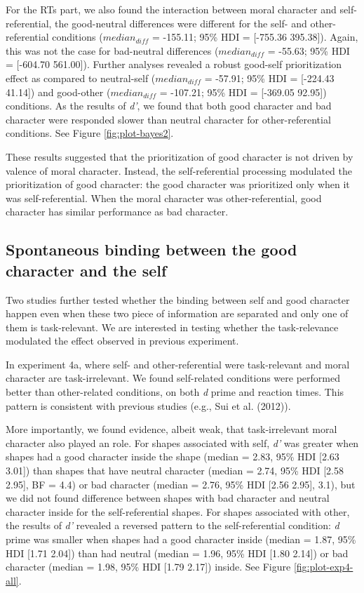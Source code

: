 \documentclass[
  man]{apa6}
\begin{document}
For the RTs part, we also found the interaction between moral character and self-referential, the good-neutral differences were different for the self- and other-referential conditions (\(median_{diff}\) = -155.11; 95\% HDI = {[}-755.36 395.38{]}). Again, this was not the case for bad-neutral differences (\(median_{diff}\) = -55.63; 95\% HDI = {[}-604.70 561.00{]}). Further analyses revealed a robust good-self prioritization effect as compared to neutral-self (\(median_{diff}\) = -57.91; 95\% HDI = {[}-224.43 41.14{]}) and good-other (\(median_{diff}\) = -107.21; 95\% HDI = {[}-369.05 92.95{]}) conditions. As the results of \emph{d'}, we found that both good character and bad character were responded slower than neutral character for other-referential conditions. See Figure \ref{fig:plot-bayes2}.

These results suggested that the prioritization of good character is not driven by valence of moral character. Instead, the self-referential processing modulated the prioritization of good character: the good character was prioritized only when it was self-referential. When the moral character was other-referential, good character has similar performance as bad character.

\hypertarget{spontaneous-binding-between-the-good-character-and-the-self}{%
\subsection{Spontaneous binding between the good character and the self}\label{spontaneous-binding-between-the-good-character-and-the-self}}

Two studies further tested whether the binding between self and good character happen even when these two piece of information are separated and only one of them is task-relevant. We are interested in testing whether the task-relevance modulated the effect observed in previous experiment.

In experiment 4a, where self- and other-referential were task-relevant and moral character are task-irrelevant. We found self-related conditions were performed better than other-related conditions, on both \emph{d} prime and reaction times. This pattern is consistent with previous studies (e.g., Sui et al. (2012)).

More importantly, we found evidence, albeit weak, that task-irrelevant moral character also played an role. For shapes associated with self, \emph{d'} was greater when shapes had a good character inside the shape (median = 2.83, 95\% HDI {[}2.63 3.01{]}) than shapes that have neutral character (median = 2.74, 95\% HDI {[}2.58 2.95{]}, BF = 4.4) or bad character (median = 2.76, 95\% HDI {[}2.56 2.95{]}, 3.1), but we did not found difference between shapes with bad character and neutral character inside for the self-referential shapes. For shapes associated with other, the results of \emph{d'} revealed a reversed pattern to the self-referential condition: \emph{d} prime was smaller when shapes had a good character inside (median = 1.87, 95\% HDI {[}1.71 2.04{]}) than had neutral (median = 1.96, 95\% HDI {[}1.80 2.14{]}) or bad character (median = 1.98, 95\% HDI {[}1.79 2.17{]}) inside. See Figure \ref{fig:plot-exp4-all}.
\end{document}
